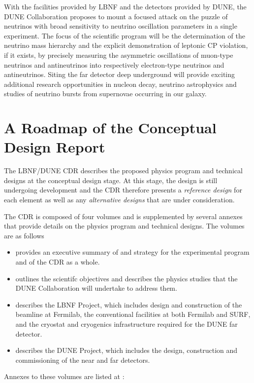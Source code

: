 With the facilities provided by LBNF and the detectors
provided by DUNE, the DUNE Collaboration proposes to mount a focused
attack on the puzzle of neutrinos with broad sensitivity to neutrino
oscillation parameters in a single experiment.  The focus of the
scientific program will be the determination of the neutrino mass hierarchy and the 
explicit demonstration of leptonic CP violation, if it exists, by precisely 
measuring the asymmetric oscillations of muon-type neutrinos and antineutrinos 
into respectively electron-type neutrinos and
antineutrinos.  Siting the far detector deep underground will provide
exciting additional research opportunities in nucleon decay, neutrino
astrophysics and studies of neutrino bursts from supernovae occurring
in our galaxy.

\section{A Roadmap of the Conceptual Design Report}

The LBNF/DUNE CDR describes the proposed physics program and 
technical designs at the conceptual design stage.  At this stage, the design is
still undergoing development and the CDR therefore presents a \textit{reference design} 
for each element as well as any \textit{alternative designs} that are under consideration.

The CDR is composed of four volumes and is supplemented by several annexes that 
provide details on the physics program and technical designs. The volumes are as follows

\begin{itemize}
\item \volintro provides an executive summary of and strategy for the experimental 
program and of the CDR as a whole.
\item \volphys outlines the scientifc objectives and describes the physics studies that 
the DUNE Collaboration will undertake to address them.
\item \vollbnf describes the LBNF Project, which includes design and construction of the 
beamline at Fermilab, the conventional facilities at both Fermilab and SURF, and the cryostat
 and cryogenics infrastructure required for the DUNE far detector.
\item \voldune describes the DUNE Project, which includes the design, construction and 
commissioning of the near and far detectors. 
\end{itemize}

Annexes to these volumes are listed at :

